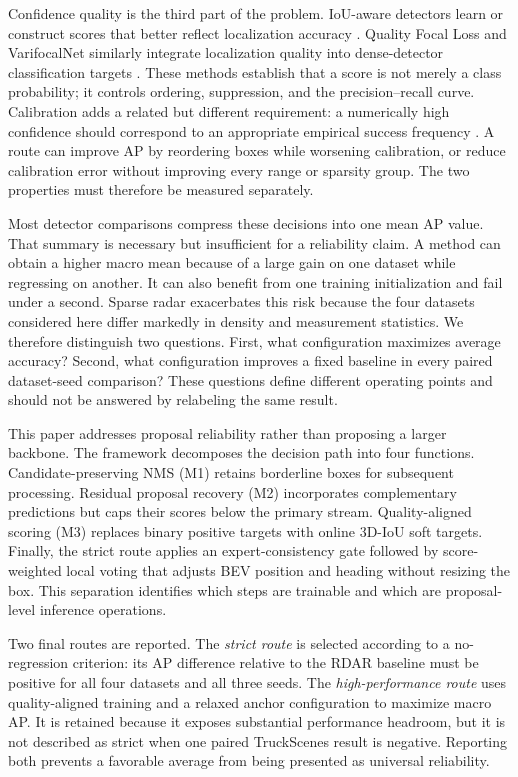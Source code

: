 \documentclass[final,5p,times]{elsarticle}
\begin{document}
Confidence quality is the third part of the problem. IoU-aware detectors learn
or construct scores that better reflect localization accuracy
\cite{jiang2018iounet}. Quality Focal Loss and VarifocalNet similarly integrate
localization quality into dense-detector classification targets
\cite{li2022gfl,zhang2021varifocalnet}. These methods establish that a score is
not merely a class probability; it controls ordering, suppression, and the
precision--recall curve. Calibration adds a related but different requirement:
a numerically high confidence should correspond to an appropriate empirical
success frequency \cite{guo2017calibration}. A route can improve AP by
reordering boxes while worsening calibration, or reduce calibration error
without improving every range or sparsity group. The two properties must
therefore be measured separately.

Most detector comparisons compress these decisions into one mean AP value.
That summary is necessary but insufficient for a reliability claim. A method
can obtain a higher macro mean because of a large gain on one dataset while
regressing on another. It can also benefit from one training initialization
and fail under a second. Sparse radar exacerbates this risk because the four
datasets considered here differ markedly in density and measurement
statistics. We therefore distinguish two questions. First, what configuration
maximizes average accuracy? Second, what configuration improves a fixed
baseline in every paired dataset-seed comparison? These questions define
different operating points and should not be answered by relabeling the same
result.

This paper addresses proposal reliability rather than proposing a larger
backbone. The framework decomposes the decision path into four functions.
Candidate-preserving NMS (M1) retains borderline boxes for subsequent
processing. Residual proposal recovery (M2) incorporates complementary
predictions but caps their scores below the primary stream. Quality-aligned
scoring (M3) replaces binary positive targets with online 3D-IoU soft targets.
Finally, the strict route applies an expert-consistency gate followed by
score-weighted local voting that adjusts BEV position and heading without
resizing the box. This separation identifies which steps are trainable and
which are proposal-level inference operations.

Two final routes are reported. The \emph{strict route} is selected according
to a no-regression criterion: its AP difference relative to the RDAR baseline
must be positive for all four datasets and all three seeds. The
\emph{high-performance route} uses quality-aligned training and a relaxed
anchor configuration to maximize macro AP. It is retained because it exposes
substantial performance headroom, but it is not described as strict when one
paired TruckScenes result is negative. Reporting both prevents a favorable
average from being presented as universal reliability.
\end{document}
